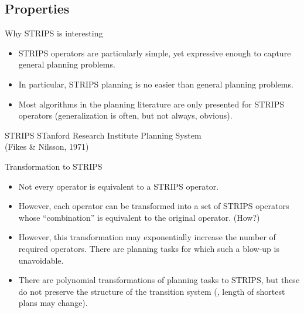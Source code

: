 \documentclass{gkibeamer}
\begin{document}
\subsection{Properties}
\begin{frame}{Why STRIPS is interesting}
  \begin{itemize}
  \item STRIPS operators are \alert{particularly simple}, yet
    expressive enough to capture general planning problems.
  \item In particular, STRIPS planning is \alert{no easier} than
    general planning problems.
  \item Most algorithms in the planning literature are \alert{only
    presented for STRIPS operators} (generalization is often, but not
    always, obvious).
  \end{itemize}
  \begin{block}{STRIPS}
    STanford Research Institute Planning System \\
    (Fikes \& Nilsson, 1971)
  \end{block}
\end{frame}

\begin{frame}{Transformation to STRIPS}
  \begin{itemize}
  \item Not every operator is equivalent to a STRIPS operator.
  \item However, each operator can be transformed into a \alert{set}
    of STRIPS operators whose ``combination'' is equivalent to the
    original operator. (How?)
  \item However, this transformation may exponentially increase the
    number of required operators. There are planning tasks for which
    such a blow-up is unavoidable.
  \item There are polynomial transformations of planning tasks to
    STRIPS, but these do not preserve the structure of the transition
    system (\eg, length of shortest plans may change).
  \end{itemize}
\end{frame}
\end{document}
